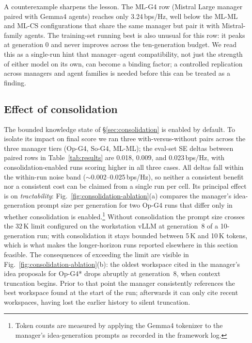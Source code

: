\documentclass[journal]{IEEEtran}
\begin{document}
A counterexample sharpens the lesson. The ML-G4 row (Mistral Large manager paired with Gemma4 agents) reaches only 3.24\,bps/Hz, well below the ML-ML and ML-CS configurations that share the same manager but pair it with Mistral-family agents. The training-set running best is also unusual for this row: it peaks at generation 0 and never improves across the ten-generation budget. We read this as a single-run hint that manager--agent compatibility, not just the strength of either model on its own, can become a binding factor; a controlled replication across managers and agent families is needed before this can be treated as a finding.

\subsection{Effect of consolidation}
\label{sec:consolidation-ablation}

The bounded knowledge state of \S\ref{sec:consolidation} is enabled by default. To isolate its impact on final score we ran three with-versus-without pairs across the three manager tiers (Op-G4, So-G4, ML-ML); the eval-set SE deltas between paired rows in Table~\ref{tab:results} are 0.018, 0.009, and 0.023\,bps/Hz, with consolidation-enabled runs scoring higher in all three cases. All deltas fall within the within-run noise band ($\sim$0.002--0.025\,bps/Hz), so neither a consistent benefit nor a consistent cost can be claimed from a single run per cell. Its principal effect is on \emph{tractability}: Fig.~\ref{fig:consolidation-ablation}(a) compares the manager's idea-generation prompt size per generation for two Op-G4 runs that differ only in whether consolidation is enabled.\footnote{Token counts are measured by applying the Gemma4 tokenizer to the manager's idea-generation prompts as recorded in the framework log.} Without consolidation the prompt size crosses the 32\,K limit configured on the workstation vLLM at generation~8 of a 10-generation run; with consolidation it stays bounded between 5\,K and 10\,K tokens, which is what makes the longer-horizon runs reported elsewhere in this section feasible. The consequences of exceeding the limit are visible in Fig.~\ref{fig:consolidation-ablation}(b): the oldest workspace cited in the manager's idea proposals for Op-G4* drops abruptly at generation~8, when context truncation begins. Prior to that point the manager consistently references the best workspace found at the start of the run; afterwards it can only cite recent workspaces, having lost the earlier history to silent truncation.
\end{document}
